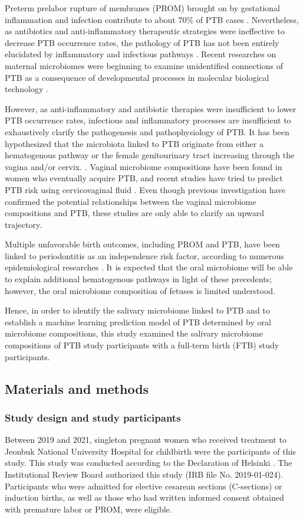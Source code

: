 \documentclass[11pt, a4paper, onecolumn, oneside]{report}
\begin{document}
            Preterm prelabor rupture of membranes (PROM) brought on by gestational inflammation and infection contribute to about 70\% of PTB cases \cite{PTB-prediction-5}. Nevertheless, as antibiotics and anti-inflammatory therapeutic strategies were ineffective to decrease PTB occurrence rates, the pathology of PTB has not been entirely elucidated by inflammatory and infectious pathways \cite{PTB-mechanism-1}. Recent researches on maternal microbiomes were beginning to examine unidentified connections of PTB as a consequence of developmental processes in molecular biological technology \cite{PTB-mechanism-2}.

            However, as anti-inflammatory and antibiotic therapies were insufficient to lower PTB occurrence rates, infectious and inflammatory processes are insufficient to exhaustively clarify the pathogenesis and pathophysiology of PTB. It has been hypothesized that the microbiota linked to PTB originate from either a hematogenous pathway or the female genitourinary tract increasing through the vagina and/or cervix. \cite{PTB-mechanism-3}. Vaginal microbiome compositions have been found in women who eventually acquire PTB, and recent studies have tried to predict PTB risk using cervicovaginal fluid \cite{PTB-mechanism-4}. Even though previous investigation have confirmed the potential relationships between the vaginal microbiome compositions and PTB, these studies are only able to clarify an upward trajectory.

            Multiple unfavorable birth outcomes, including PROM and PTB, have been linked to periodontitis as an independence risk factor, according to numerous epidemiological researches \cite{PTB-mechanism-5}. It is expected that the oral microbiome will be able to explain additional hematogenous pathways in light of these precedents; however, the oral microbiome composition of fetuses is limited understood.

            Hence, in order to identify the salivary microbiome linked to PTB and to establish a machine learning prediction model of PTB determined by oral microbiome compositions, this study examined the salivary microbiome compositions of PTB study participants with a full-term birth (FTB) study participants.
        \newpage

        \subsection{Materials and methods}
            \subsubsection{Study design and study participants}
                Between 2019 and 2021, singleton pregnant women who received treatment to Jeonbuk National University Hospital for childbirth were the participants of this study. This study was conducted according to the Declaration of Helsinki \cite{Helsinki-1}. The Institutional Review Board authorized this study (IRB file No. 2019-01-024). Participants who were admitted for elective cesarean sections (C-sections) or induction births, as well as those who had written informed consent obtained with premature labor or PROM, were eligible.
\end{document}
